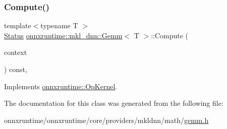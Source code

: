 \mbox{\label{classonnxruntime_1_1mkl__dnn_1_1Gemm_a0d14fa413da1f16098f1e72c6a7a0256}} 
\subsubsection{\texorpdfstring{Compute()}{Compute()}\hspace{0.1cm}{\footnotesize\ttfamily [2/2]}}
{\footnotesize\ttfamily template$<$typename T $>$ \\
\mbox{\hyperlink{classonnxruntime_1_1common_1_1Status}{Status}} \mbox{\hyperlink{classonnxruntime_1_1mkl__dnn_1_1Gemm}{onnxruntime\+::mkl\+\_\+dnn\+::\+Gemm}}$<$ T $>$\+::Compute (\begin{DoxyParamCaption}\item[{\mbox{\hyperlink{classonnxruntime_1_1OpKernelContext}{Op\+Kernel\+Context}} $\ast$}]{context }\end{DoxyParamCaption}) const\hspace{0.3cm}{\ttfamily [override]}, {\ttfamily [virtual]}}



Implements \mbox{\hyperlink{classonnxruntime_1_1OpKernel_a9eca8656a78b1b3ab9d3351a12798650}{onnxruntime\+::\+Op\+Kernel}}.



The documentation for this class was generated from the following file\+:\begin{DoxyCompactItemize}
\item 
onnxruntime/onnxruntime/core/providers/mkldnn/math/\mbox{\hyperlink{mkldnn_2math_2gemm_8h}{gemm.\+h}}\end{DoxyCompactItemize}
